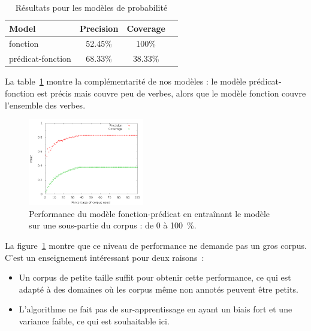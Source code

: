 \begin{table}[ht]
    \centering
    \begin{tabular}{lccc}
        \toprule
        Model          & Precision & Coverage \\
        \midrule
        fonction           & 52.45\% & 100\% \\
        prédicat-fonction & 68.33\% & 38.33\% \\
        \bottomrule
    \end{tabular}
    \caption{\protect\centering\label{table:probabilisticresults}Résultats pour les modèles de probabilité}
\end{table}

La table~\ref{table:probabilisticresults} montre la complémentarité de nos
modèles : le modèle prédicat-fonction est précis mais couvre peu de verbes, alors
que le modèle fonction couvre l'ensemble des verbes.

\begin{figure}[t]
    \centering
    \includegraphics[width=0.45\textwidth]{fig/slot-predicate-percents.png}
    \caption{\label{fig:fonction_predicate}Performance du modèle fonction-prédicat en entraînant le modèle sur une sous-partie du corpus : de 0 à 100~\%.}
\end{figure}

La figure~\ref{fig:fonction_predicate} montre que ce niveau de performance ne
demande pas un gros corpus. C'est un enseignement intéressant pour deux
raisons~:

\begin{itemize}

    \item Un corpus de petite taille suffit pour obtenir cette performance, ce
    qui est adapté à des domaines où les corpus même non annotés peuvent être
    petits.

    \item L'algorithme ne fait pas de sur-apprentissage en ayant un biais fort
    et une variance faible, ce qui est souhaitable ici.

\end{itemize}

